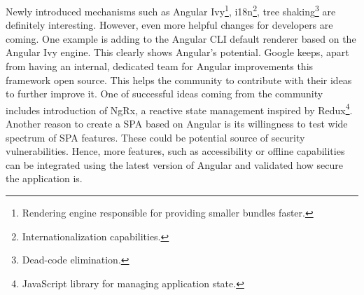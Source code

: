 \documentclass{article} %
\begin{document}
Newly introduced mechanisms such as Angular Ivy\footnote{Rendering engine responsible for providing smaller bundles faster.}, i18n\footnote{Internationalization capabilities.}, tree shaking\footnote{Dead-code elimination.} are definitely interesting. However, even more helpful changes for developers are coming. One example is adding to the Angular CLI default renderer based on the Angular Ivy engine. This clearly shows Angular's potential. Google keeps, apart from having an internal, dedicated team for Angular improvements this framework open source. This helps the community to contribute with their ideas to further improve it. One of successful ideas coming from the community includes introduction of NgRx, a reactive state management inspired by Redux\footnote{JavaScript library for managing application state.}.\\
\newline
Another reason to create a SPA based on Angular is its willingness to test wide spectrum of SPA features. These could be potential source of security vulnerabilities. Hence, more features, such as accessibility or offline capabilities can be integrated using the latest version of Angular and validated how secure the application is.
\end{document}

